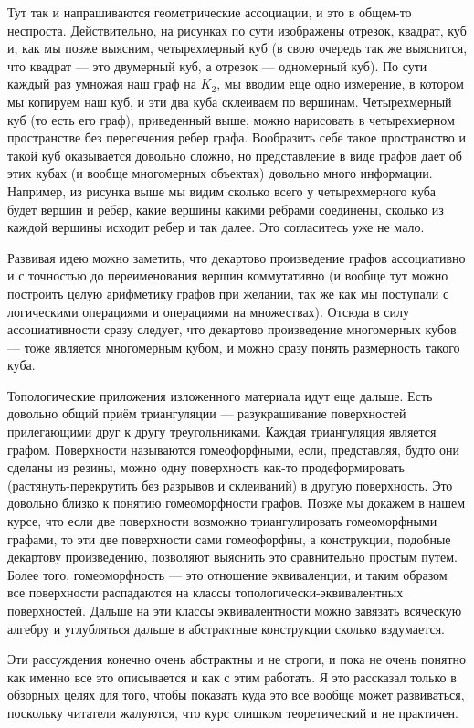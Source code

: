 Тут так и напрашиваются геометрические ассоциации, и это в общем-то неспроста. Действительно, на рисунках по сути изображены отрезок, квадрат, куб и, как мы позже выясним, четырехмерный куб (в свою очередь так же выяснится, что квадрат — это двумерный куб, а отрезок — одномерный куб). По сути каждый раз умножая наш граф на $K_2$, мы вводим еще одно измерение, в котором мы копируем наш куб, и эти два куба склеиваем по вершинам. Четырехмерный куб (то есть его граф), приведенный выше, можно нарисовать в четырехмерном пространстве без пересечения ребер графа. Вообразить себе такое пространство и такой куб оказывается довольно сложно, но представление в виде графов дает об этих кубах (и вообще многомерных объектах) довольно много информации. Например, из рисунка выше мы видим сколько всего у четырехмерного куба будет вершин и ребер, какие вершины какими ребрами соединены, сколько из каждой вершины исходит ребер и так далее. Это согласитесь уже не мало.

Развивая идею можно заметить, что декартово произведение графов ассоциативно и с точностью до переименования вершин коммутативно (и вообще тут можно построить целую арифметику графов при желании, так же как мы поступали с логическими операциями и операциями на множествах). Отсюда в силу ассоциативности сразу следует, что декартово произведение многомерных кубов — тоже является многомерным кубом, и можно сразу понять размерность такого куба.

Топологические приложения изложенного материала идут еще дальше. Есть довольно общий приём триангуляции — разукрашивание поверхностей прилегающими друг к другу треугольниками. Каждая триангуляция является графом. Поверхности называются гомеофорфными, если, представляя, будто они сделаны из резины, можно одну поверхность как-то продеформировать (растянуть-перекрутить без разрывов и склеиваний) в другую поверхность. Это довольно близко к понятию гомеоморфности графов. Позже мы докажем в нашем курсе, что если две поверхности возможно триангулировать гомеоморфными графами, то эти две поверхности сами гомеофорфны, а конструкции, подобные декартову произведению, позволяют выяснить это сравнительно простым путем. Более того, гомеоморфность — это отношение эквиваленции, и таким образом все поверхности распадаются на классы топологически-эквивалентных поверхностей. Дальше на эти классы эквивалентности можно завязать всяческую алгебру и углубляться дальше в абстрактные конструкции сколько вздумается.

Эти рассуждения конечно очень абстрактны и не строги, и пока не очень понятно как именно все это описывается и как с этим работать. Я это рассказал только в обзорных целях для того, чтобы показать куда это все вообще может развиваться, поскольку читатели жалуются, что курс слишком теоретический и не практичен.

